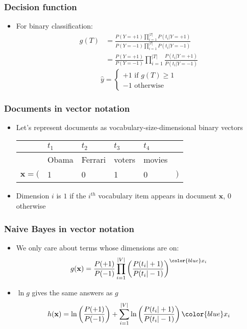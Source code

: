 \documentclass[14pt,mathserif]{beamer}
\newcommand{\x}{\mathbf{x}}
\begin{document}
\begin{frame}\frametitle{Decision function}
\begin{itemize}
  \item For binary classification:
    \begin{align}\nonumber
    g(T) & = \frac{P(Y=+1)\prod_{i=1}^{|T|} P(t_i|Y=+1)}
                {P(Y=-1)\prod_{i=1}^{|T|} P(t_i|Y=-1)}\\\nonumber
         & = \frac{P(Y=+1)}{P(Y=-1)}\prod_{i=1}^{|T|} \frac{P(t_i|Y=+1)}{P(t_i|Y=-1)}
    \end{align}
    \[
    \hat{y} = 
    \begin{cases}
      +1 \text{ if } g(T) \geq 1\\
      -1 \text{ otherwise }
    \end{cases}
    \]
  \end{itemize}
\end{frame}

\begin{frame}
  \frametitle{Documents in vector notation}
  \begin{itemize}
  \item Let's represent documents as vocabulary-size-dimensional
    binary vectors 

    \begin{tabular}{rlllll}
          &    $t_1$& $t_2$   & $t_3$   & $t_4$   & \\\hline
          & Obama   & Ferrari & voters  & movies & \\\hline
$\x = ($   & 1       & 0       & 1       & 0 & $)$\\
    \end{tabular}
  \item Dimension $i$ is $1$ if the $i^{th}$ vocabulary item appears in
    document $\x$, $0$ otherwise
  \end{itemize}
\end{frame}

\begin{frame}
  \frametitle{Naive Bayes in vector notation}
  \begin{itemize}
  \item 
    We only care about terms whose dimensions are on:
    \[
      g(\x) = \frac{P(+1)}{P(-1)} \prod_{i=1}^{|V|} \left(\frac{P(t_i|+1)}{P(t_i|-1)}\right)^{\color{blue} x_i}
    \]
  \item $\ln g$ gives the same answers as $g$
    \begin{align}
      h(\x) = \ln\left(\frac{P(+1)}{P(-1)}\right) + \sum_{i=1}^{|V|} \ln\left(\frac{P(t_i|+1)}{P(t_i|-1)}\right)\color{blue}x_i
    \end{align}
  \end{itemize}
\end{frame}
\end{document}
